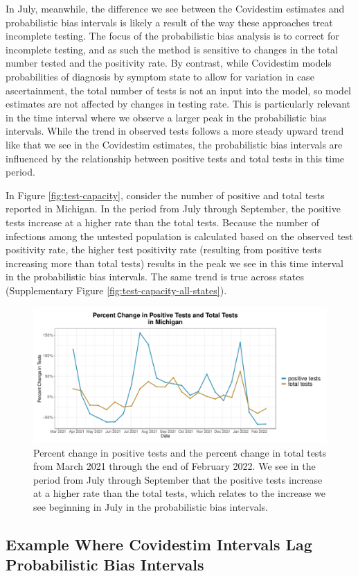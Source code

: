 \documentclass[12pt,twoside]{smiththesis}
\begin{document}
In July, meanwhile, the difference we see between the Covidestim estimates and probabilistic bias intervals is likely a result of the way these approaches treat incomplete testing. The focus of the probabilistic bias analysis is to correct for incomplete testing, and as such the method is sensitive to changes in the total number tested and the positivity rate. By contrast, while Covidestim models probabilities of diagnosis by symptom state to allow for variation in case ascertainment, the total number of tests is not an input into the model, so model estimates are not affected by changes in testing rate. This is particularly relevant in the time interval where we observe a larger peak in the probabilistic bias intervals. While the trend in observed tests follows a more steady upward trend like that we see in the Covidestim estimates, the probabilistic bias intervals are influenced by the relationship between positive tests and total tests in this time period.

In Figure \ref{fig:test-capacity}, consider the number of positive and total tests reported in Michigan. In the period from July through September, the positive tests increase at a higher rate than the total tests. Because the number of infections among the untested population is calculated based on the observed test positivity rate, the higher test positivity rate (resulting from positive tests increasing more than total tests) results in the peak we see in this time interval in the probabilistic bias intervals. The same trend is true across states (Supplementary Figure \ref{fig:test-capacity-all-states}).
\begin{figure}
\includegraphics[width=1\linewidth]{figure/test_capacity} \caption{\label{fig:test-capacity} Percent change in positive tests and the percent change in total tests from March 2021 through the end of February 2022. We see in the period from July through September that the positive tests increase at a higher rate than the total tests, which relates to the increase we see beginning in July in the probabilistic bias intervals.}\label{fig:unnamed-chunk-8}
\end{figure}
\hypertarget{example-where-covidestim-intervals-lag-probabilistic-bias-intervals}{%
\subsection{Example Where Covidestim Intervals Lag Probabilistic Bias Intervals}\label{example-where-covidestim-intervals-lag-probabilistic-bias-intervals}}
\end{document}
